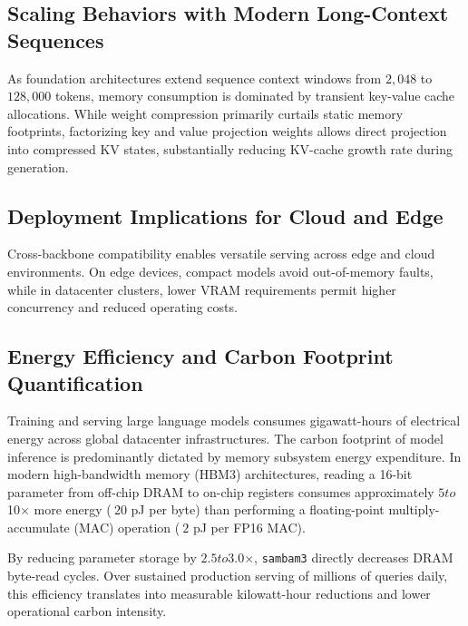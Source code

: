 \subsection{Scaling Behaviors with Modern Long-Context Sequences}
As foundation architectures extend sequence context windows from $2{,}048$ to $128{,}000$ tokens, memory consumption is dominated by transient key-value cache allocations. While weight compression primarily curtails static memory footprints, factorizing key and value projection weights allows direct projection into compressed KV states, substantially reducing KV-cache growth rate during generation.

\subsection{Deployment Implications for Cloud and Edge}
Cross-backbone compatibility enables versatile serving across edge and cloud environments. On edge devices, compact models avoid out-of-memory faults, while in datacenter clusters, lower VRAM requirements permit higher concurrency and reduced operating costs.

\subsection{Energy Efficiency and Carbon Footprint Quantification}
Training and serving large language models consumes gigawatt-hours of electrical energy across global datacenter infrastructures. The carbon footprint of model inference is predominantly dictated by memory subsystem energy expenditure. In modern high-bandwidth memory (HBM3) architectures, reading a 16-bit parameter from off-chip DRAM to on-chip registers consumes approximately $5$\times$ to $10$\times$ more energy ($~20$ pJ per byte) than performing a floating-point multiply-accumulate (MAC) operation ($~2$ pJ per FP16 MAC).

By reducing parameter storage by $2.5$\times$ to $3.0$\times$, \texttt{sambam3} directly decreases DRAM byte-read cycles. Over sustained production serving of millions of queries daily, this efficiency translates into measurable kilowatt-hour reductions and lower operational carbon intensity.
